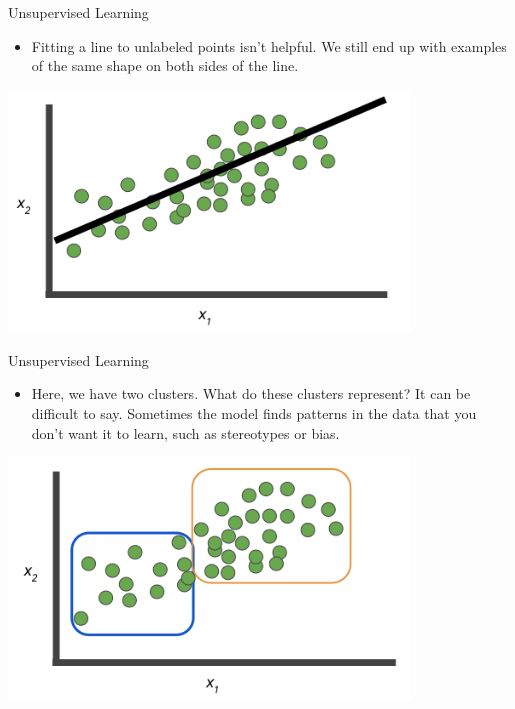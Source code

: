 \documentclass{beamer}
\begin{document}
\begin{frame}{Unsupervised Learning}

\begin{itemize}
\item Fitting a line to unlabeled points isn't helpful. We still end up with examples of the same shape on both sides of the line. 
\end{itemize}

\includegraphics[width=0.8\textwidth]{images/Graph5.png}

\end{frame}


\begin{frame}{Unsupervised Learning}

\begin{itemize}
\item Here, we have two clusters. What do these clusters represent? It can be difficult to say. Sometimes the model finds patterns in the data that you don't want it to learn, such as stereotypes or bias.

\end{itemize}

\includegraphics[width=0.8\textwidth]{images/Graph6.png}

\end{frame}
\end{document}
